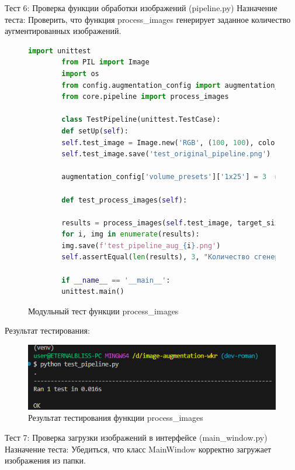 Тест 6: Проверка функции обработки изображений (pipeline.py)
Назначение теста: Проверить, что функция process\_images генерирует заданное количество аугментированных изображений.

\begin{figure}[H]
	\begin{lstlisting}[language=Python]
		import unittest
		from PIL import Image
		import os
		from config.augmentation_config import augmentation_config
		from core.pipeline import process_images
		
		class TestPipeline(unittest.TestCase):
		def setUp(self):
		self.test_image = Image.new('RGB', (100, 100), color='white')
		self.test_image.save('test_original_pipeline.png')
		
		augmentation_config['volume_presets']['1х25'] = 3  # Уменьшаем для теста
		
		def test_process_images(self):
		
		results = process_images(self.test_image, target_size=(100, 100), volume_level='1х25')
		for i, img in enumerate(results):
		img.save(f'test_pipeline_aug_{i}.png')
		self.assertEqual(len(results), 3, "Количество сгенерированных изображений не равно 3.")
		
		if __name__ == '__main__':
		unittest.main()
	\end{lstlisting}  
	\caption{Модульный тест функции process\_images}
	\label{model_test:test6}
\end{figure}

Результат тестирования:
\begin{figure}[H]
	\centering
	\includegraphics[width=0.7\linewidth]{images/resulttest6}
	\caption{Результат тестирования функции process\_images}
	\label{fig:resulttest6}
\end{figure}

Тест 7: Проверка загрузки изображений в интерфейсе (main\_window.py)
Назначение теста: Убедиться, что класс MainWindow корректно загружает изображения из папки.

